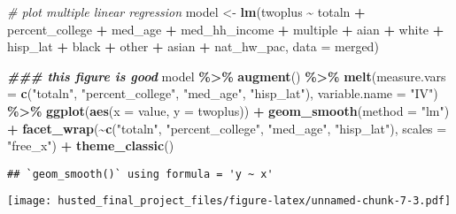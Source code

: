 \documentclass[
]{article}
\newenvironment{Shaded}{\begin{snugshade}}{\end{snugshade}}
\newcommand{\AttributeTok}[1]{\textcolor[rgb]{0.13,0.29,0.53}{#1}}
\newcommand{\CommentTok}[1]{\textcolor[rgb]{0.56,0.35,0.01}{\textit{#1}}}
\newcommand{\DocumentationTok}[1]{\textcolor[rgb]{0.56,0.35,0.01}{\textbf{\textit{#1}}}}
\newcommand{\FunctionTok}[1]{\textcolor[rgb]{0.13,0.29,0.53}{\textbf{#1}}}
\newcommand{\NormalTok}[1]{#1}
\newcommand{\OtherTok}[1]{\textcolor[rgb]{0.56,0.35,0.01}{#1}}
\newcommand{\SpecialCharTok}[1]{\textcolor[rgb]{0.81,0.36,0.00}{\textbf{#1}}}
\newcommand{\StringTok}[1]{\textcolor[rgb]{0.31,0.60,0.02}{#1}}
\begin{document}
\begin{Shaded}
\begin{Highlighting}[]
\CommentTok{\# plot multiple linear regression}
\NormalTok{model }\OtherTok{\textless{}{-}} \FunctionTok{lm}\NormalTok{(twoplus }\SpecialCharTok{\textasciitilde{}}\NormalTok{ totaln }\SpecialCharTok{+}\NormalTok{ percent\_college }\SpecialCharTok{+}\NormalTok{ med\_age }\SpecialCharTok{+}\NormalTok{ med\_hh\_income }\SpecialCharTok{+}\NormalTok{ multiple }\SpecialCharTok{+}\NormalTok{ aian }\SpecialCharTok{+}\NormalTok{ white }\SpecialCharTok{+}\NormalTok{ hisp\_lat }\SpecialCharTok{+}\NormalTok{ black }\SpecialCharTok{+}\NormalTok{ other }\SpecialCharTok{+}\NormalTok{ asian }\SpecialCharTok{+}\NormalTok{ nat\_hw\_pac, }\AttributeTok{data =}\NormalTok{ merged)}

\DocumentationTok{\#\#\# this figure is good}
\NormalTok{model }\SpecialCharTok{\%\textgreater{}\%}
  \FunctionTok{augment}\NormalTok{() }\SpecialCharTok{\%\textgreater{}\%}
  \FunctionTok{melt}\NormalTok{(}\AttributeTok{measure.vars =} \FunctionTok{c}\NormalTok{(}\StringTok{"totaln"}\NormalTok{, }\StringTok{"percent\_college"}\NormalTok{, }\StringTok{"med\_age"}\NormalTok{, }\StringTok{"hisp\_lat"}\NormalTok{), }\AttributeTok{variable.name =} \StringTok{"IV"}\NormalTok{) }\SpecialCharTok{\%\textgreater{}\%}
  \FunctionTok{ggplot}\NormalTok{(}\FunctionTok{aes}\NormalTok{(}\AttributeTok{x =}\NormalTok{ value, }\AttributeTok{y =}\NormalTok{ twoplus)) }\SpecialCharTok{+}
  \FunctionTok{geom\_smooth}\NormalTok{(}\AttributeTok{method =} \StringTok{"lm"}\NormalTok{) }\SpecialCharTok{+}
  \FunctionTok{facet\_wrap}\NormalTok{(}\SpecialCharTok{\textasciitilde{}}\FunctionTok{c}\NormalTok{(}\StringTok{"totaln"}\NormalTok{, }\StringTok{"percent\_college"}\NormalTok{, }\StringTok{"med\_age"}\NormalTok{, }\StringTok{"hisp\_lat"}\NormalTok{), }\AttributeTok{scales =} \StringTok{"free\_x"}\NormalTok{) }\SpecialCharTok{+}
  \FunctionTok{theme\_classic}\NormalTok{()}
\end{Highlighting}
\end{Shaded}

\begin{verbatim}
## `geom_smooth()` using formula = 'y ~ x'
\end{verbatim}

\texttt{[image: husted\_final\_project\_files/figure-latex/unnamed-chunk-7-3.pdf]}
\end{document}
